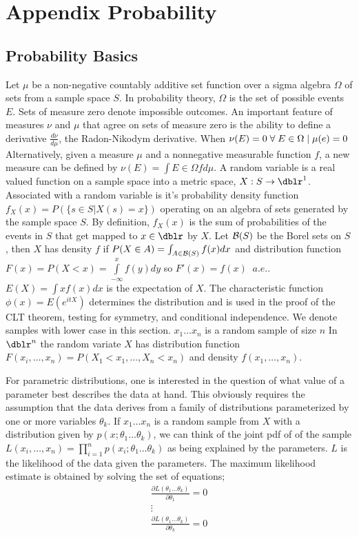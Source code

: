 \chapter{Appendix Probability}

\section*{Probability Basics}
Let $\mu$ be a non-negative countably additive set function over a sigma algebra $\Omega$ of sets from a sample space $S$. In probability theory, $\Omega$ is the set of possible events $E$. Sets of measure zero denote impossible outcomes. An important feature of measures $\nu$ and $\mu$ that agree on sets of measure zero is the ability to define a derivative $\frac{d \nu}{d \mu}$, the Radon-Nikodym derivative.  When $\nu (E)=0 \; \forall \; E \in \Omega \;| \; \mu(e)=0$  Alternatively, given a measure $\mu$ and a nonnegative measurable function $f$, a new measure can be defined by $ \nu(E) = \int\limits{E \in \Omega}{} f d \mu$. A random variable is a real valued function on a sample space into a metric space, $X : S \rightarrow \dblr^{1} $. Associated with a random variable is it's probability density function $f_{X}(x)=P(\{s \in S | X(s) = x\})$ operating on an algebra of sets generated by the sample space $S$. By definition, $f_{X}(x)$ is the sum of probabilities of the events in $S$ that get mapped to $x \in \dblr$ by $X$.  Let $\mathcal{B}(S)$ be the Borel sets on $S$, then $X$ has density $f$ if $P(X \in A) = \int_{A \in \mathcal{B}(S)} f(x) dx $ and distribution function $F(x) = P(X<x)=\int\limits_{-\infty}^x f(y) dy$ so $F'(x)=f(x) \;\; a.e.$.  $E(X)=\int x f(x) dx$ is the expectation of $X$.  The characteristic function $\phi(x) = E(e^{itX} )$ determines the distribution and is used in the proof of the CLT theorem, testing for symmetry, and conditional independence.  We denote samples with lower case in this section.  $x_1 \ldots x_n$ is a random sample of size $n$  In $\dblr^n$ the random variate $X$ has distribution function $F(x_i, \ldots , x_n) = P(X_1<x_1, \ldots , X_n<x_n )$ and density $f(x_1, \ldots , x_n )$.

For parametric distributions, one is interested in the question of what value of a parameter best describes the data at hand.  This obviously requires the assumption that the data derives from a family of distributions parameterized by one or more variables $\theta_k$.  If $x_1 \ldots x_n$ is a random sample from $X$ with a distribution given by $p(x;\theta_1 \ldots \theta_k)$, we can think of the joint pdf of of the sample $L(x_i, \ldots,x_n) = \prod\limits_{i=1}^{n} p(x_i;\theta_1 \ldots \theta_k)$ as being explained by the parameters.  $L$ is the likelihood of the data given the parameters.  The maximum likelihood estimate is obtained by solving the set of equations;
\begin{eqnarray} \nonumber
  \frac{\partial L(\theta_1 \ldots \theta_k)}{\partial
  \theta_1}=0 \\ \nonumber
  \vdots \\ \nonumber
   \frac{\partial L(\theta_1 \ldots \theta_k)}{\partial
   \theta_k}=0 \\ \nonumber
\end{eqnarray}

